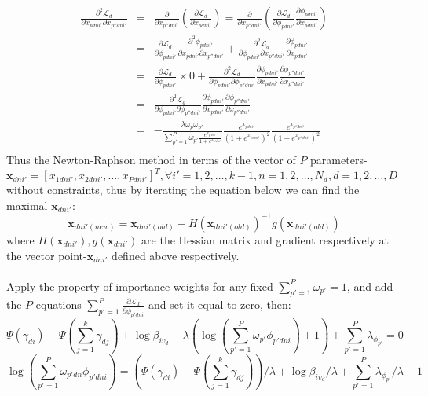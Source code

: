\documentclass{article}
\newcommand{\be}{\begin{equation}}
\newcommand{\ee}{\end{equation}}
\newcommand{\bs}{\boldsymbol}
\newcommand{\ba}{\begin{array}}
\newcommand{\ea}{\end{array}}
\newcommand{\Sum}{\displaystyle\sum}
\begin{document}
\be
\ba{rcl}
\frac{\partial^2\mathcal{L}_d}{\partial x_{pdni'}\partial x_{p''dni'}}&=&\frac{\partial}{\partial x_{p''dni'}}\left(\frac{\partial\mathcal{L}_d}{\partial x_{pdni'}}\right)=\frac{\partial}{\partial x_{p''dni'}}\left(\frac{\partial\mathcal{L}_d}{\partial \phi_{pdni'}}\frac{\partial\phi_{pdni'}}{\partial x_{pdni'}}\right)\\
&=&\frac{\partial\mathcal{L}_d}{\partial \phi_{pdni'}}\frac{\partial^2\phi_{pdni'}}{\partial x_{pdni'}\partial x_{p''dni'}}+\frac{\partial^2\mathcal{L}_d}{\partial \phi_{pdni'}\partial x_{p''dni'}}\frac{\partial\phi_{pdni'}}{\partial x_{pdni'}}\\
&=&\frac{\partial\mathcal{L}_d}{\partial \phi_{pdni'}}\times 0+\frac{\partial^2\mathcal{L}_d}{\partial \phi_{pdni'}\partial \phi_{p''dni'}}\frac{\partial\phi_{pdni'}}{\partial x_{pdni'}}\frac{\partial\phi_{p''dni'}}{\partial x_{p''dni'}}\\
&=&\frac{\partial^2\mathcal{L}_d}{\partial \phi_{pdni'}\partial \phi_{p''dni'}}\frac{\partial\phi_{pdni'}}{\partial x_{pdni'}}\frac{\partial\phi_{p''dni'}}{\partial x_{p''dni'}}\\
&=&-\frac{\lambda\omega_p\omega_{p''}}{\sum_{p'=1}^{P}\omega_{p'}\frac{e^{x_{p'dni'}}}{1+e^{x_{p'dni'}}}}\frac{e^{x_{pdni'}}}{(1+e^{x_{pdni'}})^2}\frac{e^{x_{p''dni'}}}{(1+e^{x_{p''dni'}})^2}\\
\ea
\ee
Thus the Newton-Raphson method in terms of the vector of $P$ parameters-$\bs{x}_{dni'}=[x_{1dni'}, x_{2dni'}, \ldots, x_{Pdni'}]^T,\forall i'=1,2,\ldots,k-1,n=1,2,\ldots,N_d,d=1,2,\ldots,D$ without constraints, thus  by iterating the equation below we can find the maximal-$\bs{x}_{dni'}$:\\
\[
\bs{x}_{dni'(new)}=\bs{x}_{dni'(old)}-H(\bs{x}_{dni'(old)})^{-1}g(\bs{x}_{dni'(old)})
\]
where $H(\bs{x}_{dni'}),g(\bs{x}_{dni'})$ are the Hessian matrix and gradient respectively at the vector point-$\bs{x}_{dni'}$ defined above respectively.\\
\\
Apply the property of importance weights for any fixed $\Sum_{p'=1}^{P}\omega_{p'}=1$,
and add the $P$ equations-$\sum_{p'=1}^{P}\frac{\partial\mathcal{L}_d}{\partial \phi_{p'dni}}$ and set it equal to zero, then:\\
\[
\Psi(\gamma_{di})-\Psi(\sum_{j=1}^{k}\gamma_{dj})+\log\beta_{iv_d}-\lambda(\log(\sum_{p'=1}^{P}\omega_{p'
}\phi_{p'dni})+1)+\sum_{p'=1}^{P}\lambda_{\phi_{p'}}=0
\]
\[
\log(\sum_{p'=1}^{P}\omega_{p'dn}\phi_{p'dni})=(\Psi(\gamma_{di})-\Psi(\sum_{j=1}^{k}\gamma_{dj}))/\lambda+\log\beta_{iv_d}/\lambda+\sum_{p'=1}^{P}\lambda_{\phi_{p'}}/\lambda-1
\]
\end{document}
